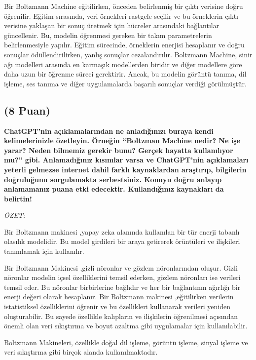 \documentclass[11pt]{article}
\begin{document}
Bir Boltzmann Machine eğitilirken, önceden belirlenmiş bir çıktı verisine doğru öğrenilir. Eğitim sırasında, veri örnekleri rastgele seçilir ve bu örneklerin çıktı verisine yaklaşan bir sonuç üretmek için hücreler arasındaki bağlantılar güncellenir. Bu, modelin öğrenmesi gereken bir takım parametrelerin belirlenmesiyle yapılır. Eğitim sürecinde, örneklerin enerjisi hesaplanır ve doğru sonuçlar ödüllendirilirken, yanlış sonuçlar cezalandırılır.
Boltzmann Machine, sinir ağı modelleri arasında en karmaşık modellerden biridir ve diğer modellere göre daha uzun bir öğrenme süreci gerektirir. Ancak, bu modelin görüntü tanıma, dil işleme, ses tanıma ve diğer uygulamalarda başarılı sonuçlar verdiği görülmüştür.




\subsection{(8 Puan)} \textbf{ChatGPT’nin açıklamalarından ne anladığınızı buraya kendi kelimelerinizle özetleyin. Örneğin ``Boltzman Machine nedir? Ne işe yarar? Neden bilmemiz gerekir bunu? Gerçek hayatta kullanılıyor mu?'' gibi. Anlamadığınız kısımlar varsa ve ChatGPT’nin açıklamaları yeterli gelmezse internet dahil farklı kaynaklardan araştırıp, bilgilerin doğruluğunu sorgulamakta serbestsiniz. Konuyu doğru anlayıp anlamamanız puana etki edecektir. Kullandığınız kaynakları da belirtin!}

\textit{ÖZET: }

Bir Boltzmann makinesi ,yapay zeka alanında kullanılan bir tür enerji tabanlı olasılık modelidir. Bu model girdileri bir araya getirerek örüntüleri ve ilişkileri tanımlamak için kullanılır. 

Bir Boltzmann Makinesi ,gizli nöronlar ve gözlem nöronlarından oluşur. Gizli nöronlar modelin içsel özelliklerini temsil ederken, gözlem nöronları ise verileri temsil eder.  Bu nöronlar birbirlerine bağlıdır ve her bir bağlantının ağırlığı bir enerji değeri olarak hesaplanır. Bir Boltzmann makinesi ,eğitilirken verilerin istatistiksel özelliklerini öğrenir ve bu özellikleri kullanarak verileri yeniden oluşturabilir. Bu sayede özellikle kalıpların ve ilişkilerin öğrenilmesi açısından önemli olan veri sıkıştırma ve boyut azaltma gibi uygulamalar için kullanılabilir. 

Boltzmann Makineleri, özellikle doğal dil işleme, görüntü işleme, sinyal işleme ve veri sıkıştırma gibi birçok alanda kullanılmaktadır.
\end{document}
